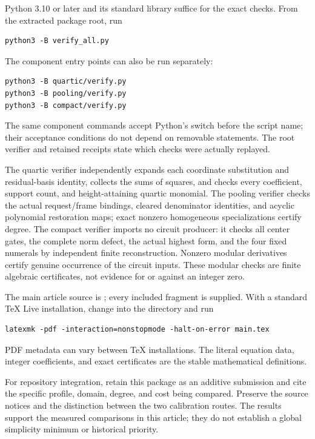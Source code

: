 Python 3.10 or later and its standard library suffice for the exact
checks.  From the extracted package root, run
\begin{lstlisting}
python3 -B verify_all.py
\end{lstlisting}
The component entry points can also be run separately:
\begin{lstlisting}
python3 -B quartic/verify.py
python3 -B pooling/verify.py
python3 -B compact/verify.py
\end{lstlisting}
The same component commands accept Python's  switch before the
script name; their acceptance conditions do not depend on removable
 statements.  The root verifier and retained receipts state
which checks were actually replayed.

The quartic verifier independently expands each coordinate substitution
and residual-basis identity, collects the sums of squares, and checks
every coefficient, support count, and height-attaining quartic monomial.
The pooling verifier checks the actual request/frame bindings, cleared
denominator identities, and acyclic polynomial restoration maps; exact
nonzero homogeneous specializations certify degree.  The compact verifier
imports no circuit producer: it checks all center gates, the complete norm
defect, the actual highest form, and the four fixed numerals by independent
finite reconstruction.  Nonzero modular derivatives certify genuine
occurrence of the circuit inputs.  These modular checks are finite
algebraic certificates, not evidence for or against an integer zero.

The main article source is ; every included
 fragment is supplied.  With a standard TeX Live installation,
change into the  directory and run
\begin{lstlisting}
latexmk -pdf -interaction=nonstopmode -halt-on-error main.tex
\end{lstlisting}
PDF metadata can vary between TeX installations.  The literal equation
data, integer coefficients, and exact certificates are the stable
mathematical definitions.

For repository integration, retain this package as an additive submission
and cite the specific profile, domain, degree, and cost being compared.
Preserve the source notices and the distinction between the two calibration
routes.  The results support the measured comparisons in this article;
they do not establish a global simplicity minimum or historical priority.
